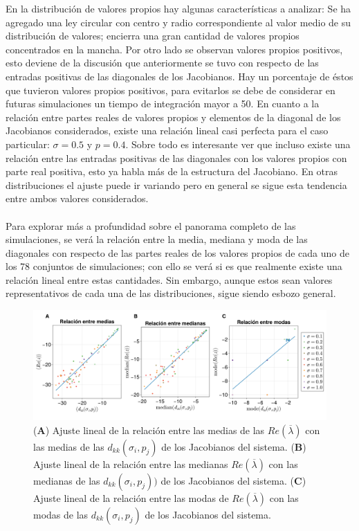 En la distribución de valores propios hay algunas características a analizar: Se ha agregado una ley circular con centro y radio correspondiente al valor medio de su distribución de valores; encierra una gran cantidad de valores propios concentrados en la mancha. Por otro lado se observan valores propios positivos, esto deviene de la discusión que anteriormente se tuvo con respecto de las entradas positivas de las diagonales de los Jacobianos. Hay un porcentaje de éstos que tuvieron valores propios positivos, para evitarlos se debe de considerar en futuras simulaciones un tiempo de integración mayor a 50. En cuanto a la relación entre partes reales de valores propios y elementos de la diagonal de los Jacobianos considerados, existe una relación lineal casi perfecta para el caso particular: $\sigma=0.5$ y $p=0.4$. Sobre todo es interesante ver que incluso existe una relación entre las entradas positivas de las diagonales con los valores propios con parte real positiva, esto ya habla más de la estructura del Jacobiano. En otras distribuciones el ajuste puede ir variando pero en general se sigue esta tendencia entre ambos valores considerados.\\
\\
Para explorar más a profundidad sobre el panorama completo de las simulaciones, se verá la relación entre la media, mediana y moda de las diagonales con respecto de las partes reales de los valores propios de cada uno de los 78 conjuntos de simulaciones; con ello se verá si es que realmente existe una relación lineal entre estas cantidades. Sin embargo, aunque estos sean valores representativos de cada una de las distribuciones, sigue siendo esbozo general.
\begin{figure}[h!]
	\centering
	\includegraphics[scale=0.16]{../Imagenes/AjustesLinMeds}
	\caption{(\textbf{A}) Ajuste lineal de la relación entre las medias de las $Re(\overline{\lambda})$ con las medias de las $d_{kk}(\sigma_i,p_j)$ de los Jacobianos del sistema. (\textbf{B}) Ajuste lineal de la relación entre las medianas $Re(\overline{\lambda})$ con las medianas de las $d_{kk}(\sigma_i,p_j))$ de los Jacobianos del sistema. (\textbf{C}) Ajuste lineal de la relación entre las modas de $Re(\overline{\lambda})$ con las modas de las $d_{kk}(\sigma_i,p_j)$ de los Jacobianos del sistema.}
	\label{fig:AjustesLinMeds}
\end{figure}

